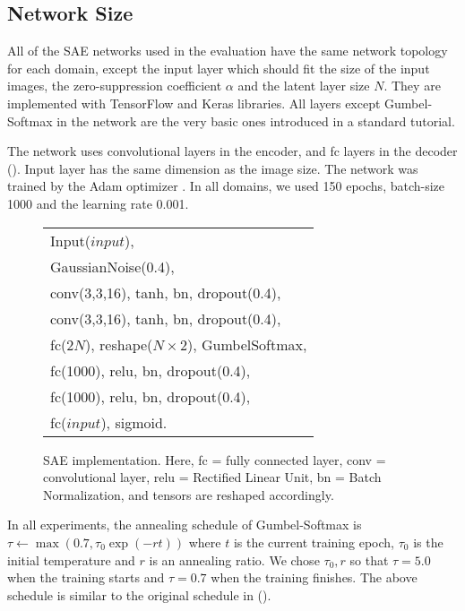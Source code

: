 \documentclass[10pt,letterpaper]{article}
\begin{document}
\subsection{Network Size}

All of the SAE networks used in the evaluation have the same network
topology for each domain, except the input layer which should fit the size of the input
images, the zero-suppression coefficient $\alpha$ and the latent layer size $N$.
They are implemented with TensorFlow and Keras libraries.
All layers except Gumbel-Softmax in the network are the very basic ones introduced in a standard tutorial.

The network uses convolutional layers in the encoder, and fc layers
in the decoder ().
Input layer has the same dimension as the image size.
The network was trained by the Adam optimizer \cite{kingma2014adam}.
In all domains, we used 150 epochs, batch-size 1000 and the learning rate 0.001.

\begin{figure}[htb]
\centering
\begin{tabular}{|l|}
 Input($input$),\\
 GaussianNoise(0.4),\\
 conv(3,3,16), tanh, bn, dropout(0.4),\\
 conv(3,3,16), tanh, bn, dropout(0.4),\\
 fc(2$N$), reshape($N\times 2$), GumbelSoftmax,\\
 fc(1000), relu, bn, dropout(0.4),\\
 fc(1000), relu, bn, dropout(0.4),\\
 fc($input$), sigmoid.
\end{tabular}
\caption{SAE implementation.
 Here, fc = fully connected layer, conv = convolutional layer, 
relu = Rectified Linear Unit,
bn = Batch Normalization, %
and tensors are reshaped accordingly.}
\label{fig:sae-detail}
\end{figure}


In all experiments, 
the annealing schedule of Gumbel-Softmax is $\tau \leftarrow \max (0.7, \tau_0\exp(-rt))$ where
 $t$ is the current training epoch, $\tau_0$ is the initial temperature and $r$ is an annealing ratio.
We chose $\tau_0,r$ so that $\tau = 5.0$ when the training starts and $\tau = 0.7$ when the training finishes.
The above schedule is similar to the original schedule in  \citeauthor{jang2016categorical} (\citeyear{jang2016categorical}).
\end{document}
